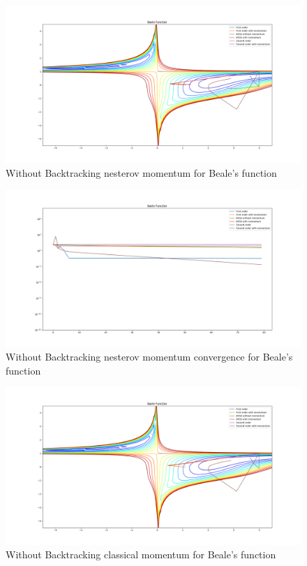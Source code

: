 \documentclass{article}
\begin{document}
\begin{figure}[H]
	\includegraphics[width=\linewidth]{../Images/baelenesterov.png}
	\caption{Without Backtracking nesterov momentum for Beale's function}
	\label{fig:Without Backtracking nesterov momentum for Beale's function}
\end{figure}

\begin{figure}[H]
	\includegraphics[width=\linewidth]{../Images/baelenesterov1.png}
	\caption{Without Backtracking nesterov momentum convergence for Beale's function}
	\label{fig:Without Backtracking nesterov momentum convergence for Beale's function}
\end{figure}

\begin{figure}[H]
	\includegraphics[width=\linewidth]{../Images/baelemomentum.png}
	\caption{Without Backtracking classical momentum for Beale's function}
	\label{fig:Without Backtracking classical momentum for Beale's function}
\end{figure}
\end{document}
